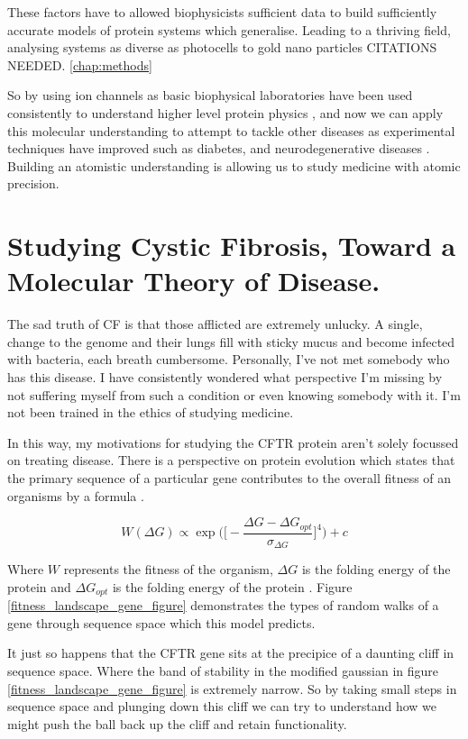 These factors have to allowed biophysicists sufficient data to build sufficiently accurate models of protein systems which generalise. Leading to a thriving field, analysing systems as diverse as photocells to gold nano particles CITATIONS NEEDED. \ref{chap:methods}

So by using ion channels as basic biophysical laboratories have been used consistently to understand higher level protein physics \cite{}, and now we can apply this molecular understanding to attempt to tackle other diseases as experimental techniques have improved such as diabetes, and neurodegenerative diseases \cite{}. Building an atomistic understanding is allowing us to study medicine with atomic precision.


\section{Studying Cystic Fibrosis, Toward a Molecular Theory of Disease.} 

The sad truth of CF is that those afflicted are extremely unlucky. A single, change to the genome and their lungs fill with sticky mucus and become infected with bacteria, each breath cumbersome. Personally, I've not met somebody who has this disease. I have consistently wondered what perspective I'm missing by not suffering myself from such a condition or even knowing somebody with it. I'm not been trained in the ethics of studying medicine.

In this way, my motivations for studying the CFTR protein aren't solely focussed on treating disease. There is a perspective on protein evolution which states that the primary sequence of a particular gene contributes to the overall fitness of an organisms by a formula \cite{depristo2005a}.

\begin{equation}
	W(\Delta G) \propto \exp\bigg(\bigg[-\frac{\Delta G - \Delta G_{opt}}{\sigma_{\Delta G}}\bigg]^4\bigg) + c
\end{equation}

Where $W$ represents the fitness of the organism, $\Delta G$ is the folding energy of the protein and $\Delta G_{opt}$ is the folding energy of the protein . Figure \ref{fitness_landscape_gene_figure} demonstrates the types of random walks of a gene through sequence space which this model predicts. 

It just so happens that the CFTR gene sits at the precipice of a daunting cliff in sequence space. Where the band of stability in the modified gaussian in figure \ref{fitness_landscape_gene_figure} is extremely narrow. So by taking small steps in sequence space and plunging down this cliff we can try to understand how we might push the ball back up the cliff and retain functionality.

